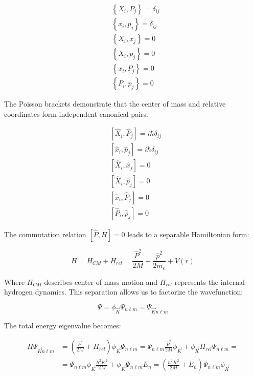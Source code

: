 \begin{align}
& \left\{X_{i}, P_{j}\right\}=\delta_{i j} \\
& \left\{x_{i}, p_{j}\right\}=\delta_{i j} \\
& \left\{X_{i}, x_{j}\right\}=0 \\
& \left\{X_{i}, p_{j}\right\}=0  \\
& \left\{x_{i}, P_{j}\right\}=0 \\
& \left\{P_{i}, p_{j}\right\}=0
\end{align}

The Poisson brackets demonstrate that the center of mass and relative coordinates form independent canonical pairs.

\begin{align}
& {\left[\hat{X}_{i}, \hat{P}_{j}\right]=i \hbar \delta_{i j}} \\
& {\left[\hat{x}_{i}, \hat{p}_{j}\right]=i \hbar \delta_{i j}} \\
& {\left[\hat{X}_{i}, \hat{x}_{j}\right]=0} \\
& {\left[\hat{X}_{i}, \hat{p}_{j}\right]=0}  \\
& {\left[\hat{x}_{i}, \hat{P}_{j}\right]=0} \\
& {\left[\hat{P}_{i}, \hat{p}_{j}\right]=0}
\end{align}

The commutation relation $[\hat{P}, H]=0$ leads to a separable Hamiltonian form:

\begin{equation}
H=H_{CM}+H_{rel}=\frac{\hat{P}^{2}}{2 M}+\frac{\hat{p}^{2}}{2 m_{e}}+V(r)
\end{equation}

Where $H_{CM}$ describes center-of-mass motion and $H_{rel}$ represents the internal hydrogen dynamics. This separation allows us to factorize the wavefunction:

\begin{equation}
\Psi=\phi_{\vec{K}} \Psi_{n \ell m}=\Psi_{\vec{K} n \ell m}
\end{equation}

The total energy eigenvalue becomes:

\begin{align}
H \Psi_{\vec{K} n \ell m} & =\left(\frac{\hat{P}^{2}}{2 M}+H_{rel}\right) \phi_{\vec{K}} \Psi_{n \ell m}=\Psi_{n \ell m} \frac{\hat{P}^{2}}{2 M} \phi_{\vec{K}}+\phi_{\vec{K}} H_{rel} \Psi_{n \ell m}=  \\
& =\Psi_{n \ell m} \phi_{\vec{K}} \frac{\hbar^{2} K^{2}}{2 M}+\phi_{\vec{K}} \Psi_{n \ell m} E_{n}=\left(\frac{\hbar^{2} K^{2}}{2 M}+E_{n}\right) \Psi_{n \ell m} \phi_{\vec{K}}
\end{align}
